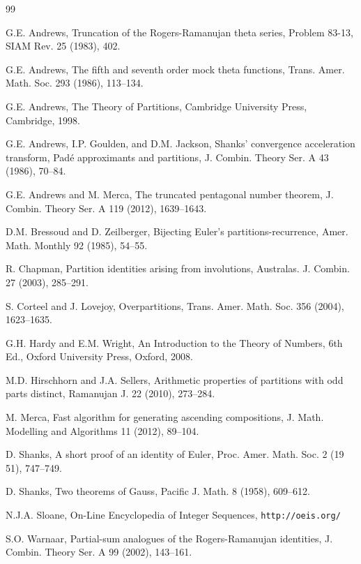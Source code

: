 \documentclass[12pt]{article}
\theoremstyle{remark}
\numberwithin{equation}{section}
\begin{document}
\begin{thebibliography}{99}
\small \setlength{\itemsep}{-.8mm}

G.E. Andrews, Truncation of the Rogers-Ramanujan theta series, Problem 83-13,
SIAM Rev. 25 (1983), 402.

 G.E. Andrews,
The fifth and seventh order mock theta functions,
Trans. Amer. Math. Soc. 293 (1986),  113--134.

 G.E. Andrews,
The Theory of Partitions, Cambridge University Press, Cambridge, 1998.

G.E. Andrews, I.P. Goulden, and D.M. Jackson,
Shanks' convergence acceleration transform, Pad\'e approximants and partitions,
J. Combin. Theory Ser. A 43 (1986), 70--84.

G.E. Andrews and M. Merca, The truncated pentagonal number theorem,
J. Combin. Theory Ser. A 119 (2012),  1639--1643.

D.M. Bressoud and D. Zeilberger, Bijecting Euler's
partitions-recurrence, Amer. Math. Monthly 92 (1985), 54--55.

R. Chapman, Partition identities arising from involutions,
Australas. J. Combin. 27 (2003), 285--291.

S. Corteel and J. Lovejoy, Overpartitions, Trans. Amer. Math. Soc. 356 (2004),
1623--1635.

G.H. Hardy and E.M. Wright, An Introduction to the Theory of Numbers, 6th Ed.,
Oxford University Press, Oxford, 2008.

M.D. Hirschhorn and J.A. Sellers,
Arithmetic properties of partitions with odd parts distinct, Ramanujan J. 22 (2010), 273--284.

M. Merca, Fast algorithm for generating ascending compositions, J. Math. Modelling
and Algorithms  11 (2012), 89--104.

D. Shanks, A short proof of an identity of Euler, Proc. Amer. Math. Soc. 2 (19 51),
747--749.

D. Shanks, Two theorems of Gauss, Pacific J. Math. 8 (1958), 609--612.

N.J.A. Sloane, On-Line Encyclopedia of Integer Sequences, {\tt http://oeis.org/}

S.O. Warnaar, Partial-sum analogues of the Rogers-Ramanujan identities,
J. Combin. Theory Ser. A 99 (2002), 143--161.


\end{thebibliography}
\end{document}
